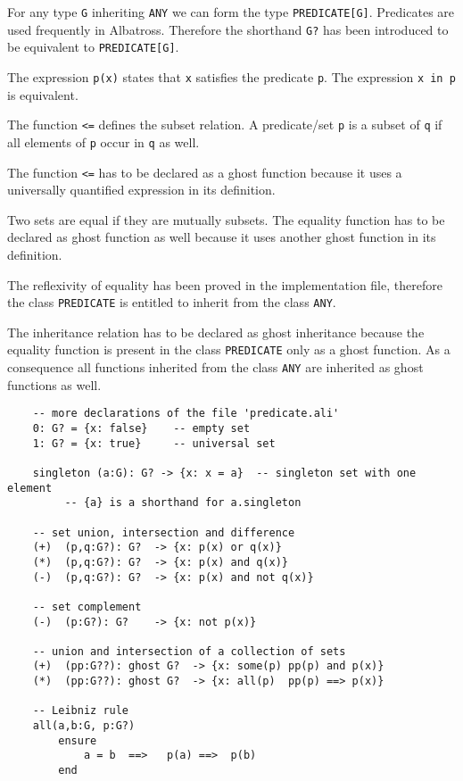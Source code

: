 For any type \lstinline!G! inheriting \lstinline!ANY! we can form the type
\lstinline!PREDICATE[G]!. Predicates are used frequently in
Albatross. Therefore the shorthand \lstinline!G?! has been introduced to be
equivalent to \lstinline!PREDICATE[G]!.

The expression \lstinline!p(x)! states that \lstinline!x! satisfies the
predicate \lstinline!p!. The expression \lstinline!x in p! is equivalent.

The function \lstinline!<=! defines the subset relation. A predicate/set
\lstinline!p! is a subset of \lstinline!q! if all elements of \lstinline!p!
occur in \lstinline!q! as well.

The function \lstinline!<=! has to be declared as a ghost function because it
uses a universally quantified expression in its definition.

Two sets are equal if they are mutually subsets. The equality function has to
be declared as ghost function as well because it uses another ghost function
in its definition.

The reflexivity of equality has been proved in the implementation file,
therefore the class \lstinline!PREDICATE! is entitled to inherit from the
class \lstinline!ANY!.

The inheritance relation has to be declared as ghost inheritance because the
equality function is present in the class \lstinline!PREDICATE! only as a
ghost function. As a consequence all functions inherited from the class
\lstinline!ANY! are inherited as ghost functions as well.

\begin{lstlisting}
    -- more declarations of the file 'predicate.ali'
    0: G? = {x: false}    -- empty set
    1: G? = {x: true}     -- universal set

    singleton (a:G): G? -> {x: x = a}  -- singleton set with one element
         -- {a} is a shorthand for a.singleton

    -- set union, intersection and difference
    (+)  (p,q:G?): G?  -> {x: p(x) or q(x)}
    (*)  (p,q:G?): G?  -> {x: p(x) and q(x)}
    (-)  (p,q:G?): G?  -> {x: p(x) and not q(x)}

    -- set complement
    (-)  (p:G?): G?    -> {x: not p(x)}

    -- union and intersection of a collection of sets
    (+)  (pp:G??): ghost G?  -> {x: some(p) pp(p) and p(x)}
    (*)  (pp:G??): ghost G?  -> {x: all(p)  pp(p) ==> p(x)}

    -- Leibniz rule
    all(a,b:G, p:G?)
        ensure
            a = b  ==>   p(a) ==>  p(b)
        end
\end{lstlisting}

